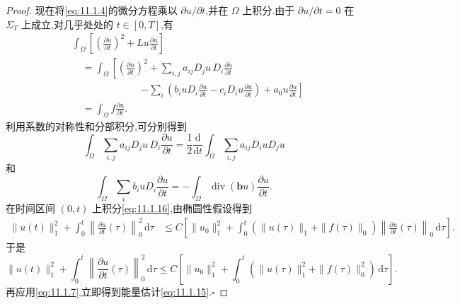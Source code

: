 \begin{proof}
现在将\eqref{eq:11.1.4}的微分方程乘以 \(\partial u/\partial t\),并在 \(\Omega\) 上积分.由于 \(\partial u/\partial t=0\) 在 \(\Sigma_T\) 上成立,对几乎处处的 \(t\in[0,T]\),有
\begin{equation}\label{eq:11.1.16}
  \begin{aligned}
    &\int_\Omega\left[\left(\frac{\partial u}{\partial t}\right)^2
                        +Lu\frac{\partial u}{\partial t}\right]\\
    &\quad=\int_\Omega\left[\left(\frac{\partial u}{\partial t}\right)^2
          +\sum_{i,j}a_{ij}D_ju\,D_i\frac{\partial u}{\partial t}\right.\\
    &\hspace{7em}\left.-\sum_i\left(b_iuD_i\frac{\partial u}{\partial t}
                           -c_iD_iu\frac{\partial u}{\partial t}\right)
                  +a_0u\frac{\partial u}{\partial t}\right]\\
    &\quad=\int_\Omega f\frac{\partial u}{\partial t}.
  \end{aligned}
\end{equation}
利用系数的对称性和分部积分,可分别得到
\[
  \int_\Omega\sum_{i,j}a_{ij}D_ju\,D_i\frac{\partial u}{\partial t}
     =\frac12\frac{\mathrm d}{\mathrm dt}\int_\Omega\sum_{i,j}a_{ij}D_iuD_ju
\]
和
\[
  \int_\Omega\sum_i b_iuD_i\frac{\partial u}{\partial t}
     =-\int_\Omega\operatorname{div}(\boldsymbol{b}u)\frac{\partial u}{\partial t}.
\]
在时间区间 \((0,t)\) 上积分\eqref{eq:11.1.16},由椭圆性假设得到
\[
  \begin{aligned}
    \|u(t)\|_1^2+\int_0^t\left\|\frac{\partial u}{\partial t}(\tau)\right\|_0^2\,\mathrm d\tau
     &\le C\left[\|u_0\|_1^2+\int_0^t(\|u(\tau)\|_1+\|f(\tau)\|_0)
                        \left\|\frac{\partial u}{\partial t}(\tau)\right\|_0\,\mathrm d\tau\right].
  \end{aligned}
\]
于是
\begin{equation}\label{eq:11.1.17}
  \|u(t)\|_1^2+\int_0^t\left\|\frac{\partial u}{\partial t}(\tau)\right\|_0^2\,\mathrm d\tau
      \le C\left[\|u_0\|_1^2+\int_0^t(\|u(\tau)\|_1^2+\|f(\tau)\|_0^2)\,\mathrm d\tau\right].
\end{equation}
再应用\eqref{eq:11.1.7},立即得到能量估计\eqref{eq:11.1.15}.\hfill\(\square\)
\end{proof}

